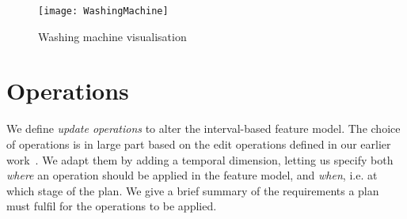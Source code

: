 \begin{figure}[htpb]
  \centering
  \texttt{[image: WashingMachine]}
  \caption{Washing machine visualisation}
  \label{ex:washing-machine-visual}
\end{figure}

\section{Operations}
\label{sec:operations}

We define \emph{update operations} to alter the interval-based feature model. The choice of operations is in large part based on the edit operations defined in our earlier work~\cite{art:consistency-preserving-evolution-planning}. We adapt them by adding a temporal dimension, letting us specify both \emph{where} an operation should be applied in the feature model, and \emph{when}, i.e. at which stage of the plan. We give a brief summary of the requirements a plan must fulfil for the operations to be applied.

